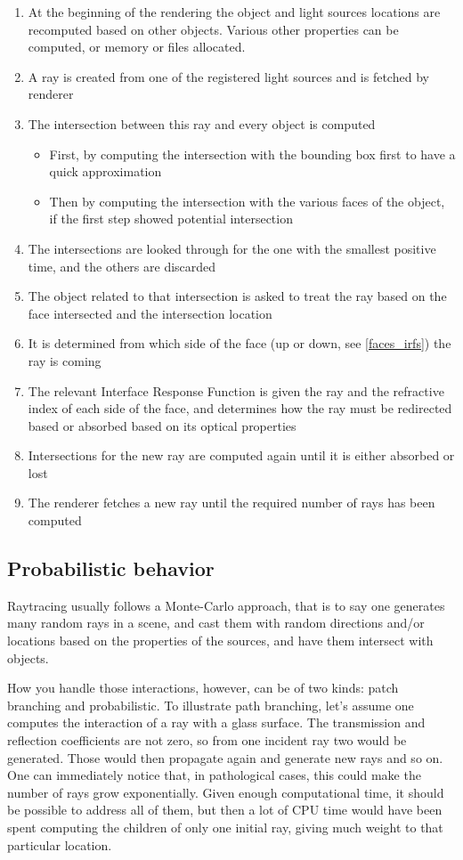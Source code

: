 \begin{enumerate}
	\item At the beginning of the rendering the object and light sources locations are recomputed based on other objects. Various other properties can be computed, or memory or files allocated.
	\item A ray is created from one of the registered light sources and is fetched by renderer
	\item The intersection between this ray and every object is computed
		\begin{itemize}
			\item First, by computing the intersection with the bounding box first to have a quick approximation
			\item Then by computing the intersection with the various faces of the object, if the first step showed potential intersection
		\end{itemize}
	\item The intersections are looked through for the one with the smallest positive time, and the others are discarded
	\item The object related to that intersection is asked to treat the ray based on the face intersected and the intersection location
	\item It is determined from which side of the face (up or down, see \ref{faces_irfs}) the ray is coming
	\item The relevant Interface Response Function is given the ray and the refractive index of each side of the face, and determines how the ray must be redirected based or absorbed based on its optical properties
	\item Intersections for the new ray are computed again until it is either absorbed or lost
	\item The renderer fetches a new ray until the required number of rays has been computed
\end{enumerate}

\subsection{Probabilistic behavior}

\label{selene_probabilistic}
Raytracing usually follows a Monte-Carlo approach, that is to say one generates many random rays in a scene, and cast them with random directions and/or locations based on the properties of the sources, and have them intersect with objects.

How you handle those interactions, however, can be of two kinds: patch branching and probabilistic. To illustrate path branching, let's assume one computes the interaction of a ray with a glass surface. The transmission and reflection coefficients are not zero, so from one incident ray two would be generated. Those would then propagate again and generate new rays and so on. One can immediately notice that, in pathological cases, this could make the number of rays grow exponentially. Given enough computational time, it should be possible to address all of them, but then a lot of CPU time would have been spent computing the children of only one initial ray, giving much weight to that particular location.

